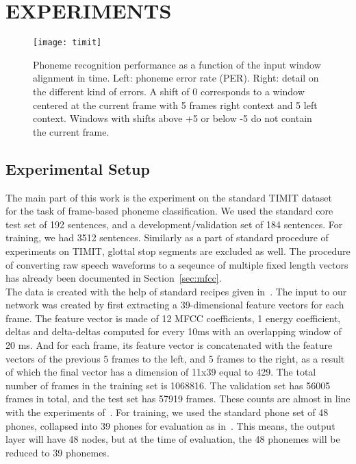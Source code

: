 \section{EXPERIMENTS}
\label{sec:experiments}
\begin{figure*}
\texttt{[image: timit]}
\caption{Phoneme recognition performance as a function of the input window alignment in time. Left: phoneme error rate (PER). Right: detail on the different kind of errors. A shift of 0 corresponds to a window centered at the current frame with 5 frames right context and 5 left context. Windows with shifts above +5 or below -5 do not contain the current frame.}
\label{fig:results}
\end{figure*}

\subsection{Experimental Setup}
The main part of this work is the experiment on the standard TIMIT dataset~\cite{timit} for the task of frame-based phoneme classification. We used the standard core test set of 192 sentences, and a development/validation set of 184 sentences. For training, we had 3512 sentences. Similarly as a part of standard procedure of experiments on TIMIT, glottal stop segments are excluded as well. The procedure of converting raw speech waveforms to a seqeunce of multiple fixed length vectors has already been documented in Section~\ref{sec:mfcc}. \\

The data is created with the help of standard recipes given in~\cite{kaldi, pdnn}. The input to our network was created by first extracting a 39-dimensional feature vectors for each frame. The feature vector is made of 12 MFCC coefficients, 1 energy coefficient, deltas and delta-deltas computed for every 10ms with an overlapping window of 20 ms. And for each frame, its feature vector is concatenated with the feature vectors of the previous 5 frames to the left, and 5 frames to the right, as a result of which the final vector has a dimension of 11x39 equal to 429.
The total number of frames in the training set is 1068816. The validation set has 56005 frames in total, and the test set has 57919 frames. These counts are almost in line with the experiments of~\cite{liu-2013, labiak-2011}.
For training, we used the standard phone set of 48 phones, collapsed into 39 phones for evaluation as in~\cite{lee-1989}. This means, the output layer will have 48 nodes, but at the time of evaluation, the 48 phonemes will be reduced to 39 phonemes. 

